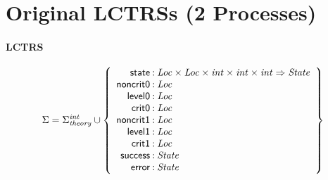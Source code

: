 \documentclass[a4paper]{article}
\newcommand{\Sort}[1]{\mathit{#1}}
\newcommand{\symb}[1]{\mathsf{#1}}
\newcommand{\Sigmainttheory}{\Sigma^{\mathit{int}}_{\mathit{theory}}}
\begin{document}

\section*{Original LCTRSs (2 Processes)}

\paragraph{LCTRS}

\[
\Sigma = 
\Sigmainttheory \cup\left\{
\begin{array}{r@{\>}c@{\>}l}
\symb{state} & : & \Sort{Loc} \times \Sort{Loc} \times \Sort{int} \times \Sort{int} \times \Sort{int} \Rightarrow \Sort{State}\\
\symb{noncrit0} & : & \Sort{Loc}\\
\symb{level0} & : & \Sort{Loc}\\
\symb{crit0} & : & \Sort{Loc}\\
\symb{noncrit1} & : & \Sort{Loc}\\
\symb{level1} & : & \Sort{Loc}\\
\symb{crit1} & : & \Sort{Loc}\\
\symb{success} & : & \Sort{State}\\
\symb{error} & : & \Sort{State}\\
\end{array}
\right\}
\]
\end{document}
